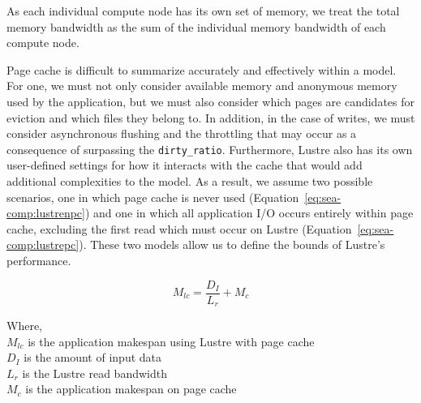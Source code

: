 \documentclass[10pt,journal,compsoc]{IEEEtran}
\begin{document}
       As each individual compute node has its own set of memory, we treat the
      total memory bandwidth as the sum of the individual memory bandwidth of
      each compute node.


      Page cache is difficult to summarize accurately and effectively within a
      model. For one, we must not only consider available memory and anonymous
      memory used by the application, but we must also consider which pages are
      candidates for eviction and which files they belong to. In addition, in
      the case of writes, we must consider asynchronous flushing and the
      throttling that may occur as a consequence of surpassing the
      \texttt{dirty\_ratio}. Furthermore, Lustre also has its own user-defined
      settings for how it interacts with the cache that would add additional
      complexities to the model. As a result, we assume two possible scenarios,
      one in which page cache is never used
      (Equation~\ref{eq:sea-comp:lustrenpc}) and one in which all application
      I/O occurs entirely within page cache, excluding the first read which must
      occur on Lustre (Equation~\ref{eq:sea-comp:lustrepc}). These two models
      allow us to define the bounds of Lustre's performance.

      \begin{equation}\label{eq:sea-comp:lustrepc}
          M_{lc} = \frac{D_{I}}{L_{r}} + M_{c}
      \end{equation}

      {\noindent} Where, \\
      $M_{lc}$ is the application makespan using Lustre with page cache \\
      $D_{I}$ is the amount of input data \\
      $L_{r}$ is the Lustre read bandwidth \\
      $M_{c}$ is the application makespan on page cache \\


\end{document}
